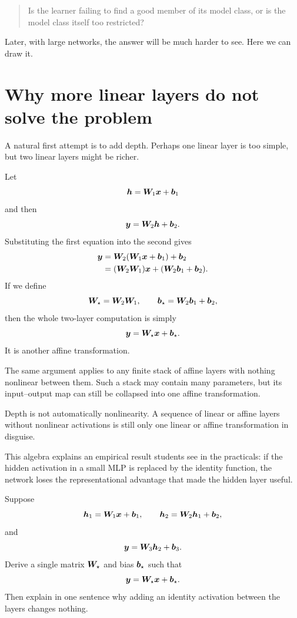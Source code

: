 \begin{quote}
Is the learner failing to find a good member of its model class, or is the model class itself too restricted?
\end{quote}

Later, with large networks, the answer will be much harder to see. Here we can draw it.

\section{Why more linear layers do not solve the problem}

A natural first attempt is to add depth. Perhaps one linear layer is too simple, but two linear layers might be richer.

Let
\[
  \bm{h}=\bm{W}_1\bm{x}+\bm{b}_1
\]
and then
\[
  \bm{y}=\bm{W}_2\bm{h}+\bm{b}_2.
\]
Substituting the first equation into the second gives
\begin{align}
  \bm{y}
    &= \bm{W}_2(\bm{W}_1\bm{x}+\bm{b}_1)+\bm{b}_2\\
    &= (\bm{W}_2\bm{W}_1)\bm{x}
       +(\bm{W}_2\bm{b}_1+\bm{b}_2).
\end{align}
If we define
\[
  \bm{W}_\star=\bm{W}_2\bm{W}_1,
  \qquad
  \bm{b}_\star=\bm{W}_2\bm{b}_1+\bm{b}_2,
\]
then the whole two-layer computation is simply
\[
  \bm{y}=\bm{W}_\star\bm{x}+\bm{b}_\star.
\]
It is another affine transformation.

The same argument applies to any finite stack of affine layers with nothing nonlinear between them. Such a stack may contain many parameters, but its input--output map can still be collapsed into one affine transformation.

\begin{keyidea}
Depth is not automatically nonlinearity. A sequence of linear or affine layers without nonlinear activations is still only one linear or affine transformation in disguise.
\end{keyidea}

This algebra explains an empirical result students see in the practicals: if the hidden activation in a small MLP is replaced by the identity function, the network loses the representational advantage that made the hidden layer useful.

\begin{optionalexercise}[title={Optional mathematics --- collapse three affine layers}]
Suppose
\[
\bm{h}_1=\bm{W}_1\bm{x}+\bm{b}_1,\qquad
\bm{h}_2=\bm{W}_2\bm{h}_1+\bm{b}_2,
\]
and
\[
\bm{y}=\bm{W}_3\bm{h}_2+\bm{b}_3.
\]
Derive a single matrix \(\bm{W}_\star\) and bias \(\bm{b}_\star\) such that
\[
\bm{y}=\bm{W}_\star\bm{x}+\bm{b}_\star.
\]
Then explain in one sentence why adding an identity activation between the layers changes nothing.
\end{optionalexercise}

